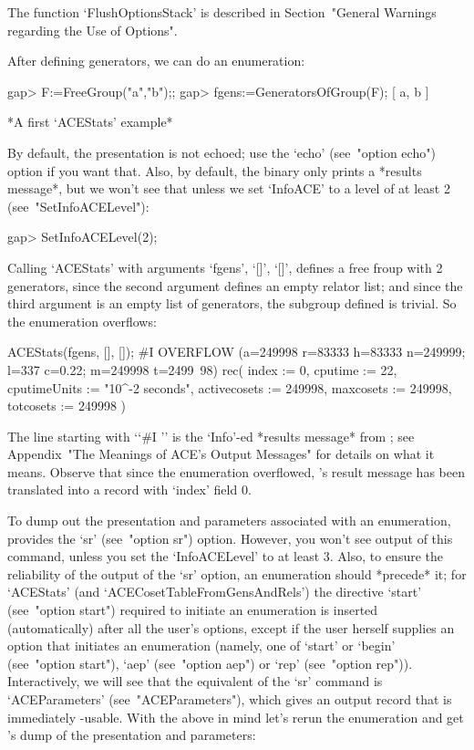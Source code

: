 The function  `FlushOptionsStack'  is  described  in  Section~"General
Warnings regarding the Use of Options".

After defining generators, we can do an enumeration:

\beginexample
gap> F:=FreeGroup("a","b");;
gap> fgens:=GeneratorsOfGroup(F);
[ a, b ]
\endexample

*A first `ACEStats' example*

By  default,  the  presentation  is  not  echoed;   use   the   `echo'
(see~"option echo") option if you want that.  Also,  by  default,  the
{\ACE} binary only prints a *results message*, but we won't  see  that
unless   we   set   `InfoACE'   to   a   level   of   at    least    2
(see~"SetInfoACELevel"):

\beginexample
gap> SetInfoACELevel(2);
\endexample

Calling `ACEStats' with arguments `fgens', `[]', `[]', defines a  free
froup with 2 generators, since the second argument  defines  an  empty
relator list; and since  the  third  argument  is  an  empty  list  of
generators, the  subgroup  defined  is  trivial.  So  the  enumeration
overflows:

\beginexample
ACEStats(fgens, [], []);
#I  OVERFLOW (a=249998 r=83333 h=83333 n=249999; l=337 c=0.22; m=249998 t=2499\
98)
rec( index := 0, cputime := 22, cputimeUnits := "10^-2 seconds", 
  activecosets := 249998, maxcosets := 249998, totcosets := 249998 )
\endexample

The  line  starting  with  \lq{}`\#I  ''  is  the  `Info'-ed  *results
message* from {\ACE};  see  Appendix~"The  Meanings  of  ACE's  Output
Messages" for details  on  what  it  means.  Observe  that  since  the
enumeration overflowed, {\ACE}'s result message  has  been  translated
into a {\GAP} record with `index' field 0.

To dump  out  the  presentation  and  parameters  associated  with  an
enumeration,  {\ACE}  provides  the  `sr'  (see~"option  sr")  option.
However, you won't see output of this  command,  unless  you  set  the
`InfoACELevel' to at least 3. Also, to ensure the reliability  of  the
output of the `sr' option, an enumeration  should  *precede*  it;  for
`ACEStats' (and `ACECosetTableFromGensAndRels') the directive  `start'
(see~"option start") required to initiate an enumeration  is  inserted
(automatically) after all the  user's  options,  except  if  the  user
herself supplies an option that initiates an enumeration (namely,  one
of `start' or `begin' (see~"option start"), `aep'  (see~"option  aep")
or `rep' (see~"option rep")). Interactively,  we  will  see  that  the
equivalent    of    the    `sr'     command     is     `ACEParameters'
(see~"ACEParameters"),  which  gives  an   output   record   that   is
immediately {\GAP}-usable. With the above  in  mind  let's  rerun  the
enumeration and get {\ACE}'s dump of the presentation and parameters:

